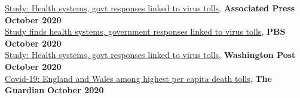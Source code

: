 \href{https://apnews.com/article/virus-outbreak-pandemics-public-health-disease-outbreaks-europe-acf6b710cab51381a05a4e1b5fc9c931}{Study: Health systems, govt responses linked to virus tolls}, \textbf{Associated Press} \hfill \textbf{October 2020}\\
\href{https://www.pbs.org/newshour/health/study-finds-health-systems-government-responses-linked-to-virus-tolls}{Study finds health systems, government responses linked to virus tolls}, \textbf{PBS} \hfill \textbf{October 2020}\\
\href{https://www.washingtonpost.com/world/europe/study-health-systems-govt-responses-linked-to-virus-tolls/2020/10/14/4c3b2d46-0e19-11eb-b404-8d1e675ec701_story.html}{Study: Health systems, govt responses linked to virus tolls}, \textbf{Washington Post} \hfill \textbf{October 2020}\\
\href{https://www.theguardian.com/world/2020/oct/14/covid-19-england-and-wales-among-highest-per-capita-death-tolls?utm_term=Autofeed&CMP=twt_gu&utm_medium&utm_source=Twitter#Echobox=1602667525}{Covid-19: England and Wales among highest per capita death tolls}, \textbf{The Guardian} \hfill \textbf{October 2020}
